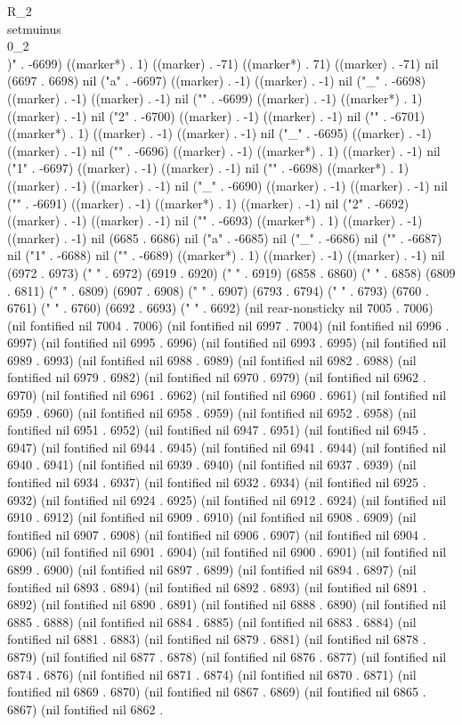  R_{2}\\setmuinus\\{0_{2}\\})" . -6699) ((marker*) . 1) ((marker) . -71) ((marker*) . 71) ((marker) . -71) nil (6697 . 6698) nil ("a" . -6697) ((marker) . -1) ((marker) . -1) nil ("_" . -6698) ((marker) . -1) ((marker) . -1) nil ("{" . -6699) ((marker) . -1) ((marker*) . 1) ((marker) . -1) nil ("2" . -6700) ((marker) . -1) ((marker) . -1) nil ("}" . -6701) ((marker*) . 1) ((marker) . -1) ((marker) . -1) nil ("_" . -6695) ((marker) . -1) ((marker) . -1) nil ("{" . -6696) ((marker) . -1) ((marker*) . 1) ((marker) . -1) nil ("1" . -6697) ((marker) . -1) ((marker) . -1) nil ("}" . -6698) ((marker*) . 1) ((marker) . -1) ((marker) . -1) nil ("_" . -6690) ((marker) . -1) ((marker) . -1) nil ("{" . -6691) ((marker) . -1) ((marker*) . 1) ((marker) . -1) nil ("2" . -6692) ((marker) . -1) ((marker) . -1) nil ("}" . -6693) ((marker*) . 1) ((marker) . -1) ((marker) . -1) nil (6685 . 6686) nil ("a" . -6685) nil ("_" . -6686) nil ("{" . -6687) nil ("1" . -6688) nil ("}" . -6689) ((marker*) . 1) ((marker) . -1) ((marker) . -1) nil (6972 . 6973) ("  " . 6972) (6919 . 6920) ("  " . 6919) (6858 . 6860) ("   " . 6858) (6809 . 6811) ("   " . 6809) (6907 . 6908) ("  " . 6907) (6793 . 6794) ("  " . 6793) (6760 . 6761) ("  " . 6760) (6692 . 6693) ("  " . 6692) (nil rear-nonsticky nil 7005 . 7006) (nil fontified nil 7004 . 7006) (nil fontified nil 6997 . 7004) (nil fontified nil 6996 . 6997) (nil fontified nil 6995 . 6996) (nil fontified nil 6993 . 6995) (nil fontified nil 6989 . 6993) (nil fontified nil 6988 . 6989) (nil fontified nil 6982 . 6988) (nil fontified nil 6979 . 6982) (nil fontified nil 6970 . 6979) (nil fontified nil 6962 . 6970) (nil fontified nil 6961 . 6962) (nil fontified nil 6960 . 6961) (nil fontified nil 6959 . 6960) (nil fontified nil 6958 . 6959) (nil fontified nil 6952 . 6958) (nil fontified nil 6951 . 6952) (nil fontified nil 6947 . 6951) (nil fontified nil 6945 . 6947) (nil fontified nil 6944 . 6945) (nil fontified nil 6941 . 6944) (nil fontified nil 6940 . 6941) (nil fontified nil 6939 . 6940) (nil fontified nil 6937 . 6939) (nil fontified nil 6934 . 6937) (nil fontified nil 6932 . 6934) (nil fontified nil 6925 . 6932) (nil fontified nil 6924 . 6925) (nil fontified nil 6912 . 6924) (nil fontified nil 6910 . 6912) (nil fontified nil 6909 . 6910) (nil fontified nil 6908 . 6909) (nil fontified nil 6907 . 6908) (nil fontified nil 6906 . 6907) (nil fontified nil 6904 . 6906) (nil fontified nil 6901 . 6904) (nil fontified nil 6900 . 6901) (nil fontified nil 6899 . 6900) (nil fontified nil 6897 . 6899) (nil fontified nil 6894 . 6897) (nil fontified nil 6893 . 6894) (nil fontified nil 6892 . 6893) (nil fontified nil 6891 . 6892) (nil fontified nil 6890 . 6891) (nil fontified nil 6888 . 6890) (nil fontified nil 6885 . 6888) (nil fontified nil 6884 . 6885) (nil fontified nil 6883 . 6884) (nil fontified nil 6881 . 6883) (nil fontified nil 6879 . 6881) (nil fontified nil 6878 . 6879) (nil fontified nil 6877 . 6878) (nil fontified nil 6876 . 6877) (nil fontified nil 6874 . 6876) (nil fontified nil 6871 . 6874) (nil fontified nil 6870 . 6871) (nil fontified nil 6869 . 6870) (nil fontified nil 6867 . 6869) (nil fontified nil 6865 . 6867) (nil fontified nil 6862 . 